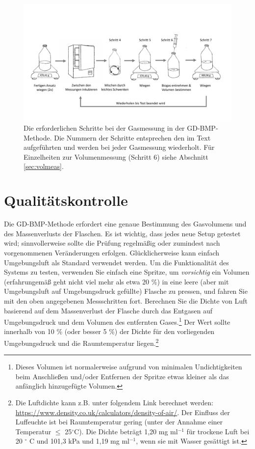\documentclass[]{article}
\begin{document}
\begin{figure}[ht]
  \includegraphics[width=\textwidth]{figs/GD_steps_DE.pdf}
  \caption{Die erforderlichen Schritte bei der Gasmessung in der GD-BMP-Methode. Die Nummern der Schritte entsprechen den im Text aufgeführten und werden bei jeder Gasmessung wiederholt. Für Einzelheiten zur Volumenmessung (Schritt 6) siehe Abschnitt \ref{sec:volmeas}.}
  \label{fig:steps}
\end{figure}


\section{Qualitätskontrolle}
Die GD-BMP-Methode erfordert eine genaue Bestimmung des Gasvolumens und des Massenverlusts der Flaschen.
Es ist wichtig, dass jedes neue Setup getestet wird; sinnvollerweise sollte die Prüfung regelmäßig oder zumindest nach vorgenommenen Veränderungen erfolgen.
Glücklicherweise kann einfach Umgebungsluft als Standard verwendet werden.
Um die Funktionalität des Systems zu testen, verwenden Sie einfach eine Spritze, um \textit{vorsichtig} ein Volumen (erfahrungemäß geht nicht viel mehr als etwa 20 \%) in eine leere (aber mit Umgebungsluft auf Umgebungsdruck gefüllte) Flasche zu pressen, und fahren Sie mit den oben angegebenen Messschritten fort.
Berechnen Sie die Dichte von Luft basierend auf dem Massenverlust der Flasche durch das Entgasen auf Umgebungsdruck und dem Volumen des entfernten Gases.\footnote{Dieses Volumen ist normalerweise aufgrund von minimalen Undichtigkeiten beim Anschließen und/oder Entfernen der Spritze etwas kleiner als das anfänglich hinzugefügte Volumen.}
Der Wert sollte innerhalb von 10 \% (oder besser 5 \%) der Dichte für den vorliegenden Umgebungsdruck und die Raumtemperatur liegen.\footnote{Die Luftdichte kann z.B. unter folgendem Link berechnet werden:  \url{https://www.density.co.uk/calculators/density-of-air/}. Der Einfluss der Luffeuchte ist bei Raumtemperatur gering (unter der Annahme einer Temperatur $\le$ 25$^\circ$C). Die Dichte beträgt 1,20 mg ml$^{-1}$ für trockene Luft bei 20 $^\circ$ C und 101,3 kPa und 1,19 mg ml$^{-1}$, wenn sie mit Wasser gesättigt ist.}
\end{document}
